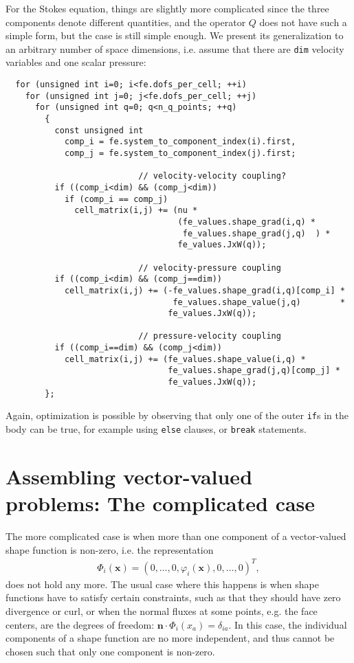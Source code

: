 \documentclass{article}
\renewcommand{\vec}[1]{{\mathbf #1}}
\begin{document}
For the Stokes equation, things are slightly more complicated since the three
components denote different quantities, and the operator $Q$ does not have
such a simple form, but the case is still simple enough. We present its
generalization to an arbitrary number of space dimensions, i.e. assume that
there are \texttt{dim} velocity variables and one scalar pressure:
\begin{verbatim}
  for (unsigned int i=0; i<fe.dofs_per_cell; ++i)
    for (unsigned int j=0; j<fe.dofs_per_cell; ++j)
      for (unsigned int q=0; q<n_q_points; ++q) 
        {
          const unsigned int
            comp_i = fe.system_to_component_index(i).first,
            comp_j = fe.system_to_component_index(j).first;

                           // velocity-velocity coupling?
          if ((comp_i<dim) && (comp_j<dim))
            if (comp_i == comp_j)
              cell_matrix(i,j) += (nu *
                                   (fe_values.shape_grad(i,q) * 
                                    fe_values.shape_grad(j,q)  ) *
                                   fe_values.JxW(q)); 

                           // velocity-pressure coupling
          if ((comp_i<dim) && (comp_j==dim))
            cell_matrix(i,j) += (-fe_values.shape_grad(i,q)[comp_i] * 
                                  fe_values.shape_value(j,q)        *
                                 fe_values.JxW(q)); 

                           // pressure-velocity coupling
          if ((comp_i==dim) && (comp_j<dim))
            cell_matrix(i,j) += (fe_values.shape_value(i,q) * 
                                 fe_values.shape_grad(j,q)[comp_j] *
                                 fe_values.JxW(q)); 
        };
\end{verbatim}
Again, optimization is possible by observing that only one of the outer
\texttt{if}s in the body can be true, for example using \texttt{else} clauses,
or \texttt{break} statements.


\section{Assembling vector-valued problems: The complicated case}

The more complicated case is when more than one component of a vector-valued
shape function is non-zero, i.e. the representation
\begin{gather*}
  \Phi_i(\vec x) = 
  \left( 0, \dots, 0, \varphi_i(\vec x), 0, \ldots, 0\right)^T,
\end{gather*}
does not hold any more. The usual case where this happens is when shape
functions have to satisfy certain constraints, such as that they should have
zero divergence or curl, or when the normal fluxes at some points, e.g. the
face centers, are the degrees of freedom: 
$\vec n\cdot \Phi_i(x_a) = \delta_{ia}$. In this case, the individual
components of a shape function are no more independent, and thus cannot be
chosen such that only one component is non-zero.
\end{document}
